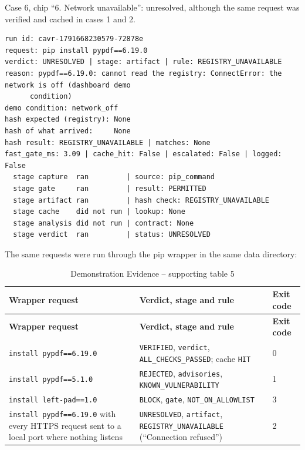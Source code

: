\noindent Case 6, chip ``6. Network unavailable'': unresolved, although the same request was verified and cached in cases 1 and 2.
\begin{singlespace}
\scriptsize
\begin{verbatim}
run id: cavr-1791668230579-72878e
request: pip install pypdf==6.19.0
verdict: UNRESOLVED | stage: artifact | rule: REGISTRY_UNAVAILABLE
reason: pypdf==6.19.0: cannot read the registry: ConnectError: the network is off (dashboard demo
      condition)
demo condition: network_off
hash expected (registry): None
hash of what arrived:     None
hash result: REGISTRY_UNAVAILABLE | matches: None
fast_gate_ms: 3.09 | cache_hit: False | escalated: False | logged: False
  stage capture  ran         | source: pip_command
  stage gate     ran         | result: PERMITTED
  stage artifact ran         | hash check: REGISTRY_UNAVAILABLE
  stage cache    did not run | lookup: None
  stage analysis did not run | contract: None
  stage verdict  ran         | status: UNRESOLVED
\end{verbatim}
\end{singlespace}

The same requests were run through the pip wrapper in the same data directory:

\setlength{\tabcolsep}{3pt}
\begin{longtable}{p{}p{}p{}}
\caption{Demonstration Evidence -- supporting table 5}\\
\toprule
\textbf{Wrapper request} & \textbf{Verdict, stage and rule} & \textbf{Exit code}\\
\midrule
\endfirsthead
\toprule
\textbf{Wrapper request} & \textbf{Verdict, stage and rule} & \textbf{Exit code}\\
\midrule
\endhead
\texttt{install pypdf==6.19.0} & \texttt{VERIFIED}, \texttt{verdict}, \texttt{ALL\_CHECKS\_PASSED}; cache \texttt{HIT} & 0\\
\texttt{install pypdf==5.1.0} & \texttt{REJECTED}, \texttt{advisories}, \texttt{KNOWN\_VULNERABILITY} & 1\\
\texttt{install left-pad==1.0} & \texttt{BLOCK}, \texttt{gate}, \texttt{NOT\_ON\_ALLOWLIST} & 3\\
\texttt{install pypdf==6.19.0} with every HTTPS request sent to a local port where nothing listens & \texttt{UNRESOLVED}, \texttt{artifact}, \texttt{REGISTRY\_UNAVAILABLE} (``Connection refused'') & 2\\
\bottomrule
\end{longtable}
\setlength{\tabcolsep}{6pt}

